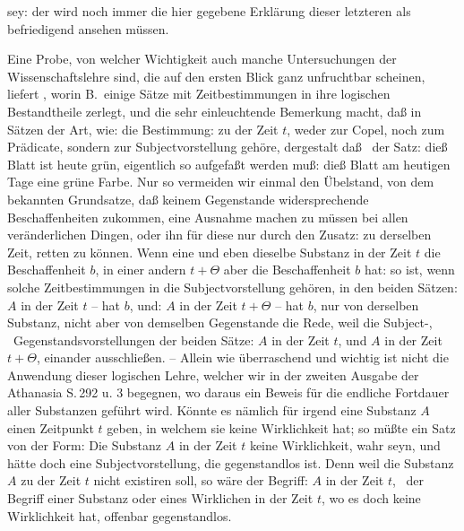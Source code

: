 sey: der wird noch immer die hier gegebene Erklärung dieser letzteren als befriedigend ansehen müssen. \par
Eine Probe, von welcher Wichtigkeit auch manche Untersuchungen der Wissenschaftslehre sind, die auf den ersten Blick ganz unfruchtbar scheinen, liefert , worin B.\ einige Sätze mit Zeitbestimmungen in ihre logischen Bestandtheile zerlegt, und die sehr einleuchtende Bemerkung macht, daß in Sätzen der Art, wie:  die Bestimmung: zu der Zeit $t$, weder zur Copel, noch zum Prädicate, sondern zur Subjectvorstellung gehöre, dergestalt daß \zB\ der Satz: dieß Blatt ist heute grün, eigentlich so aufgefaßt werden muß: dieß Blatt am heutigen Tage  eine grüne Farbe. Nur so vermeiden wir einmal den Übelstand, von dem bekannten Grundsatze, daß keinem Gegenstande widersprechende Beschaffenheiten zukommen, eine Ausnahme machen zu müssen bei allen veränderlichen Dingen, oder ihn für diese nur durch den Zusatz: zu derselben Zeit, retten zu können. Wenn eine und eben dieselbe Substanz in der Zeit $t$ die Beschaffenheit $b$, in einer andern $t+\Theta$ aber die Beschaffenheit  $b$ hat: so ist, wenn solche Zeitbestimmungen in die Subjectvorstellung gehören, in den beiden Sätzen: $A$ in der Zeit $t$ -- hat $b$, und: $A$ in der Zeit $t+\Theta$ -- hat  $b$, nur von derselben Substanz, nicht aber von demselben Gegenstande die Rede, weil die Subject-, \dh\  Gegenstandsvorstellungen der beiden Sätze: $A$ in der Zeit $t$, und $A$ in der Zeit $t+\Theta$, einander ausschließen. -- Allein wie überraschend und wichtig ist nicht die Anwendung dieser logischen Lehre, welcher wir in der zweiten Ausgabe der Athanasia S.\,292 u. 3 begegnen, wo daraus ein Beweis für die endliche Fortdauer aller Substanzen geführt wird. Könnte es nämlich für irgend eine Substanz $A$ einen Zeitpunkt $t$ geben, in welchem sie keine Wirklichkeit hat; so müßte ein Satz von der Form: Die Substanz $A$ in der Zeit $t$  keine Wirklichkeit, wahr seyn, und hätte doch eine Subjectvorstellung, die gegenstandlos ist. Denn weil die Substanz $A$ zu der Zeit $t$ nicht existiren soll, so wäre der Begriff: $A$ in der Zeit $t$, \dh\  der Begriff einer Substanz oder eines Wirklichen in der Zeit $t$, wo es doch keine Wirklichkeit hat, offenbar gegenstandlos.  \par
